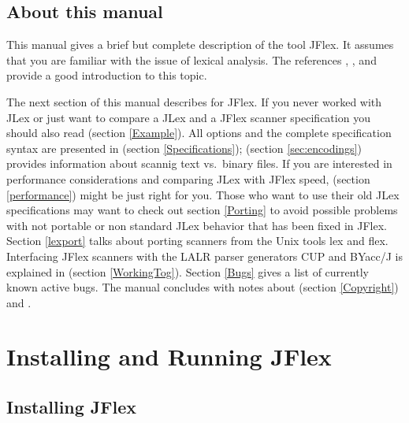 \documentclass[11pt]{scrartcl}
\begin{document}
\subsection{About this manual}
This manual gives a brief but complete description of the tool JFlex. It
assumes that you are familiar with the issue of lexical analysis. The references \cite{Aho},
\cite{Appel}, and \cite{Maurer} provide a good introduction to this topic.

The next section of this manual describes  
for JFlex. If you never worked with JLex or
just want to compare a JLex and a JFlex scanner specification you
should also read  
(section \ref{Example}).  All options and the complete
specification syntax are presented in 
 (section \ref{Specifications});
 (section \ref{sec:encodings})
provides information about scannig text vs.~binary files.
If you are interested in performance
considerations and comparing JLex with JFlex speed, 
 (section \ref{performance})
might be just right for you. Those who want to
use their old JLex specifications may want to check out section \ref{Porting}
 to avoid possible problems
with not portable or non standard JLex behavior that has been fixed in
JFlex. Section \ref{lexport} talks about porting scanners from the
Unix tools lex and flex.  Interfacing JFlex scanners with the LALR
parser generators CUP and BYacc/J is explained in  (section \ref{WorkingTog}).  Section \ref{Bugs}
 gives a list of currently known active bugs. 
The manual concludes with notes about 
 (section \ref{Copyright}) and
.


\section{Installing and Running JFlex\label{Installing}}

\subsection{Installing JFlex}
\end{document}
